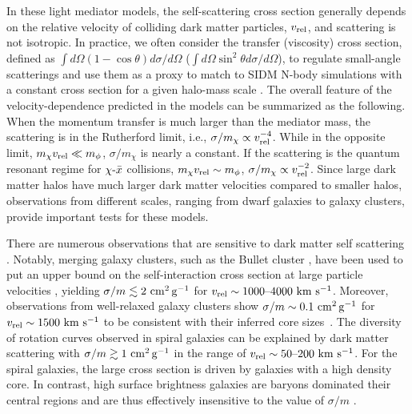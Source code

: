In these light mediator models, the self-scattering cross section generally depends on the relative velocity of colliding dark matter particles, $v_{\rm rel}$, and scattering is not isotropic. In practice, we often consider the transfer (viscosity) cross section, defined as $\int d\Omega(1-\cos\theta)d\sigma/d\Omega$ ($\int d\Omega\sin^2\theta d\sigma/d\Omega$), to regulate small-angle scatterings and use them as a proxy to match to SIDM N-body simulations with a constant cross section for a given halo-mass scale \citep[see][]{Tulin:2013teo,Kahlhoefer:2013dca}. The overall feature of the velocity-dependence predicted in the models can be summarized as the following. When the momentum transfer is much larger than the mediator mass, the scattering is in the Rutherford limit, i.e., $\sigma/m_\chi\propto v^{-4}_{\rm rel}$. While in the opposite limit, $m_\chi v_{\rm rel}\ll m_\phi$, $\sigma/m_\chi$ is nearly a constant. If the scattering is the quantum resonant regime for $\chi\textup{-}\bar{x}$ collisions, $m_\chi v_{\rm rel}\sim m_\phi$, $\sigma/m_\chi\propto v^{-2}_{\rm rel}$. Since large dark matter halos have much larger dark matter velocities compared to smaller halos, observations from different scales, ranging from dwarf galaxies to galaxy clusters, provide important tests for these models.


There are numerous observations that are sensitive to dark matter self scattering \citep[\eg,  Table 1 in][]{Tulin:2017ara}. Notably, merging galaxy clusters, such as the Bullet cluster  \citep{Randall:2007ph,2017MNRAS.465..569R}, have been used to put an upper bound on the self-interaction cross section at large particle velocities \citep[see,\eg][]{Kahlhoefer:2013dca,Kahlhoefer:2015vua,Kim:2016ujt,Harvey:2016bqd,Robertson:2016qef,Wittman:2017gxn}, yielding $\sigma/m\lesssim 2 \mathrm{\,\mathrm{\,cm}^2\mathrm{\,g}^{-1}}$ for $v_{\rm rel}\sim 1000\textup{--}4000 \mathrm{\,\mathrm{\,km}\,\mathrm{\,s}^{-1}}$. Moreover, observations from well-relaxed galaxy clusters \citep{Newman++11,Newman:2013,Newman++13b} show $\sigma/m \sim 0.1 \mathrm{\,\mathrm{\,cm}^2\mathrm{\,g}^{-1}}$ for $v_{\rm rel} \sim 1500 \mathrm{\,\mathrm{\,km}\,\mathrm{\,s}^{-1}}$ to be consistent with their inferred core sizes~\citep{Kaplinghat:2015aga,Andrade:2019wzn}. The diversity of rotation curves observed in spiral galaxies can be explained by dark matter scattering with $\sigma/m\gtrsim 1 \mathrm{\,\mathrm{\,cm}^2\mathrm{\,g}^{-1}}$ in the range of $v_{\rm rel}\sim50\textup{--}200 \mathrm{\,\mathrm{\,km}\,\mathrm{\,s}^{-1}}$. For the spiral galaxies, the large cross section is driven by galaxies with a high density core. In contrast, high surface brightness galaxies are baryons dominated their central regions and are thus effectively insensitive to the value of $\sigma/m$ \citep{Kamada:2016euw,Ren:2018jpt}. 

